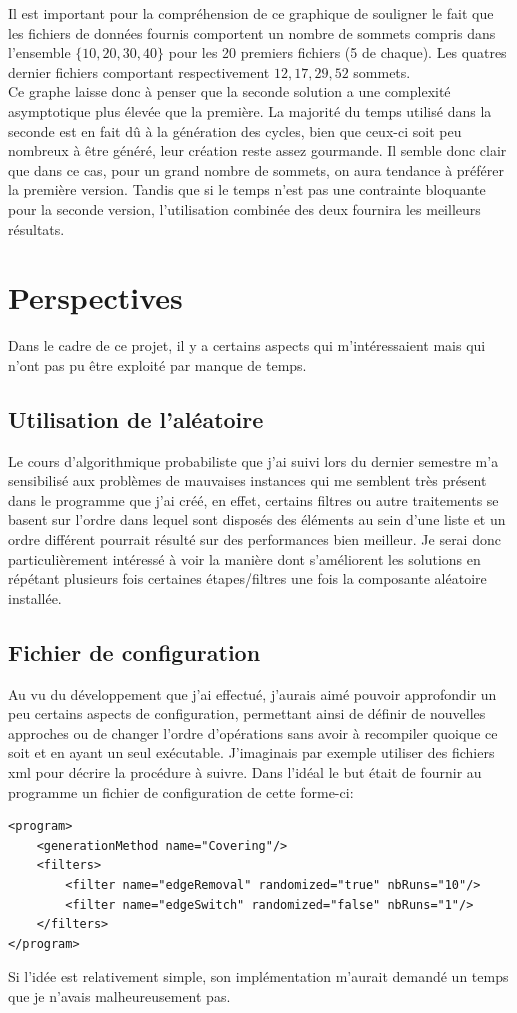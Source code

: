 \documentclass[a4paper,12pt]{article}
\begin{document}
Il est important pour la compréhension de ce graphique de souligner le fait que
les fichiers de données fournis comportent un nombre de sommets compris dans
l'ensemble $\{10,20,30,40\}$ pour les 20 premiers fichiers (5 de chaque). Les
quatres dernier fichiers comportant respectivement $12,17,29,52$ sommets.
\\
Ce graphe laisse donc à penser que la seconde solution a une complexité
asymptotique plus élevée que la première. La majorité du temps utilisé dans la
seconde est en fait dû à la génération des cycles, bien que ceux-ci soit peu
nombreux à être généré, leur création reste assez gourmande. Il semble donc
clair que dans ce cas, pour un grand nombre de sommets, on aura tendance à
préférer la première version. Tandis que si le temps n'est pas une contrainte
bloquante pour la seconde version, l'utilisation combinée des deux fournira les
meilleurs résultats.


\section{Perspectives}
Dans le cadre de ce projet, il y a certains aspects qui m'intéressaient mais qui
n'ont pas pu être exploité par manque de temps.

\subsection{Utilisation de l'aléatoire}
Le cours d'algorithmique probabiliste que j'ai suivi lors du dernier semestre
m'a sensibilisé aux problèmes de mauvaises instances qui me semblent très
présent dans le programme que j'ai créé, en effet, certains filtres ou autre
traitements se basent sur l'ordre dans lequel sont disposés des éléments au sein
d'une liste et un ordre différent pourrait résulté sur des performances bien
meilleur. Je serai donc particulièrement intéressé à voir la manière dont
s'améliorent les solutions en répétant plusieurs fois certaines étapes/filtres
une fois la composante aléatoire installée.

\subsection{Fichier de configuration}
Au vu du développement que j'ai effectué, j'aurais aimé pouvoir approfondir un
peu certains aspects de configuration, permettant ainsi de définir de nouvelles
approches ou de changer l'ordre d'opérations sans avoir à recompiler quoique ce
soit et en ayant un seul exécutable. J'imaginais par exemple utiliser des
fichiers xml pour décrire la procédure à suivre. Dans l'idéal le but était de
fournir au programme un fichier de configuration de cette forme-ci:
\begin{verbatim}
<program>
    <generationMethod name="Covering"/>
    <filters>
        <filter name="edgeRemoval" randomized="true" nbRuns="10"/>
        <filter name="edgeSwitch" randomized="false" nbRuns="1"/>
    </filters>
</program>
\end{verbatim}
Si l'idée est relativement simple, son implémentation m'aurait demandé un temps
que je n'avais malheureusement pas.
\end{document}
